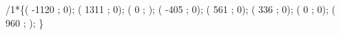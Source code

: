 /1*\{( -1120 ; 0); 
( 1311 ; 0); 
( 0 ; ); 
( -405 ; 0); 
( 561 ; 0); 
( 336 ; 0); 
( 0 ; 0); 
( 960 ; ); 
\}